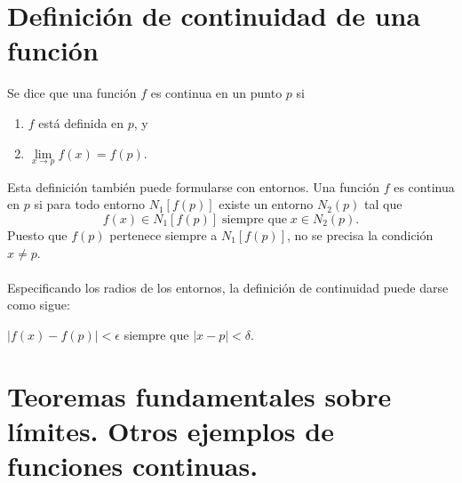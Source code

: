 \section{Definición de continuidad de una función}

\begin{tcolorbox}
    \begin{def.}
	Se dice que una función $f$ es continua en un punto $p$ si 
	\begin{enumerate}[\bfseries a)]
	    \item $f$ está definida en $p$, y
	    \item $\lim\limits_{x\to p}f(x)=f(p)$.
	\end{enumerate}
	Esta definición también puede formularse con entornos. Una función $f$ es continua en $p$ si para todo entorno $N_1[f(p)]$ existe un entorno $N_2(p)$ tal que 
	$$f(x)\in N_1[f(p)]\; \mbox{siempre que}\; x \in N_2(p).$$
	Puesto que $f(p)$ pertenece siempre a $N_1[f(p)]$, no se precisa la condición $x\neq p$.\\\\
	Especificando los radios de los entornos, la definición de continuidad puede darse como sigue:
	\begin{center}
	    $|f(x)-f(p)|<\epsilon$ siempre que $|x-p|<\delta$.
	\end{center}
    \end{def.}
\end{tcolorbox}

\section{Teoremas fundamentales sobre límites. Otros ejemplos de funciones continuas.}

